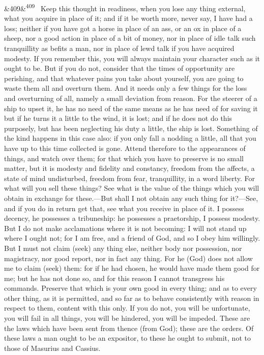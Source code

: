 \documentclass[12pt]{article}
\newcommand{\para}[1][]{\par\noindent\ifx&#1&\else\textsuperscript{\footnotesize #1}~\fi}
\begin{document}
\para[409] Keep this thought in readiness, when you lose any thing external, what you acquire in place of it; and if it be worth more, never say, I have had a loss; neither if you have got a horse in place of an ass, or an ox in place of a sheep, nor a good action in place of a bit of money, nor in place of idle talk such tranquillity as befits a man, nor in place of lewd talk if you have acquired modesty. If you remember this, you will always maintain your character such as it ought to be. But if you do not, consider that the times of opportunity are perishing, and that whatever pains you take about yourself, you are going to waste them all and overturn them. And it needs only a few things for the loss and overturning of all, namely a small deviation from reason. For the steerer of a ship to upset it, he has no need of the same means as he has need of for saving it but if he turns it a little to the wind, it is lost; and if he does not do this purposely, but has been neglecting his duty a little, the ship is lost. Something of the kind happens in this case also: if you only fall a nodding a little, all that you have up to this time collected is gone. Attend therefore to the appearances of things, and watch over them; for that which you have to preserve is no small matter, but it is modesty and fidelity and constancy, freedom from the affects, a state of mind undisturbed, freedom from fear, tranquillity, in a word liberty. For what will you sell these things? See what is the value of the things which you will obtain in exchange for these.—But shall I not obtain any such thing for it?—See, and if you do in return get that, see what you receive in place of it. I possess decency, he possesses a tribuneship: he possesses a praetorship, I possess modesty. But I do not make acclamations where it is not becoming: I will not stand up where I ought not; for I am free, and a friend of God, and so I obey him willingly. But I must not claim (seek) any thing else, neither body nor possession, nor magistracy, nor good report, nor in fact any thing. For he (God) does not allow me to claim (seek) them: for if he had chosen, he would have made them good for me; but he has not done so, and for this reason I cannot transgress his commands. Preserve that which is your own good in every thing; and as to every other thing, as it is permitted, and so far as to behave consistently with reason in respect to them, content with this only. If you do not, you will be unfortunate, you will fail in all things, you will be hindered, you will be impeded. These are the laws which have been sent from thence (from God); these are the orders. Of these laws a man ought to be an expositor, to these he ought to submit, not to those of Masurius and Cassius.
\end{document}
